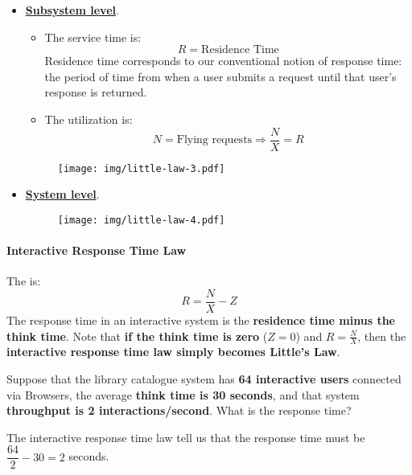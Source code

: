 \begin{itemize}
	\item \textbf{\underline{Subsystem level}}. 
	\begin{itemize}
		\item The service time is:
		\begin{equation*}
			R = \text{Residence Time}
		\end{equation*}
		Residence time corresponds to our conventional notion of response time: the period of time from when a user submits a request until that user's response is returned.
		\item The utilization is:
		\begin{equation*}
			N = \text{Flying requests} \Rightarrow \dfrac{N}{X} = R
		\end{equation*}
	\end{itemize}
	\begin{figure}[!htp]
		\centering
		\texttt{[image: img/little-law-3.pdf]}
	\end{figure}
	
	\item \textbf{\underline{System level}}. 
	\begin{figure}[!htp]
		\centering
		\texttt{[image: img/little-law-4.pdf]}
	\end{figure}
\end{itemize}

\newpage

\paragraph{Interactive Response Time Law}\label{paragraph: Interactive Response Time Law}

The  is:
\begin{equation}
	R = \dfrac{N}{X} - Z
\end{equation}
The response time in an interactive system is the \textbf{residence time minus the think time}. Note that \textbf{if the think time is zero} ($Z=0$) and $R = \frac{N}{X}$, then the \textbf{interactive response time law simply becomes Little's Law}.

\begin{examplebox}
	Suppose that the library catalogue system has \textbf{64 interactive users} connected via Browsers, the average \textbf{think time is 30 seconds}, and that system \textbf{throughput is 2 interactions/second}. What is the response time?
	
	The interactive response time law tell us that the response time must be $\dfrac{64}{2}-30 = 2$ seconds.
\end{examplebox}

